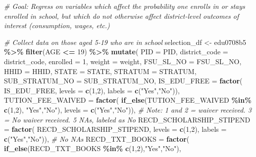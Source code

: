 \documentclass[
]{article}
\newenvironment{Shaded}{\begin{snugshade}}{\end{snugshade}}
\newcommand{\AttributeTok}[1]{\textcolor[rgb]{0.13,0.29,0.53}{#1}}
\newcommand{\CommentTok}[1]{\textcolor[rgb]{0.56,0.35,0.01}{\textit{#1}}}
\newcommand{\DecValTok}[1]{\textcolor[rgb]{0.00,0.00,0.81}{#1}}
\newcommand{\FunctionTok}[1]{\textcolor[rgb]{0.13,0.29,0.53}{\textbf{#1}}}
\newcommand{\NormalTok}[1]{#1}
\newcommand{\OtherTok}[1]{\textcolor[rgb]{0.56,0.35,0.01}{#1}}
\newcommand{\SpecialCharTok}[1]{\textcolor[rgb]{0.81,0.36,0.00}{\textbf{#1}}}
\newcommand{\StringTok}[1]{\textcolor[rgb]{0.31,0.60,0.02}{#1}}
\begin{document}
\begin{Shaded}
\begin{Highlighting}[]
\CommentTok{\# Goal: Regress on variables which affect the probability one enrolls in or stays enrolled in school, but which do not otherwise affect district{-}level outcomes of interest (consumption, wages, etc.)}


\CommentTok{\# Collect data on those aged 5{-}19 who are in school}
\NormalTok{selection\_df }\OtherTok{\textless{}{-}}\NormalTok{ edu0708b5 }\SpecialCharTok{\%\textgreater{}\%}
  \FunctionTok{filter}\NormalTok{(AGE }\SpecialCharTok{\textless{}=} \DecValTok{19}\NormalTok{) }\SpecialCharTok{\%\textgreater{}\%}
  \FunctionTok{mutate}\NormalTok{(}
    \AttributeTok{PID =}\NormalTok{ PID,}
    \AttributeTok{district\_code =}\NormalTok{ district\_code,}
    \AttributeTok{enrolled =} \DecValTok{1}\NormalTok{,}
    \AttributeTok{weight =}\NormalTok{ weight,}
    \AttributeTok{FSU\_SL\_NO =}\NormalTok{ FSU\_SL\_NO,}
    \AttributeTok{HHID =}\NormalTok{ HHID,}
    \AttributeTok{STATE =}\NormalTok{ STATE,}
    \AttributeTok{STRATUM =}\NormalTok{ STRATUM,}
    \AttributeTok{SUB\_STRATUM\_NO =}\NormalTok{ SUB\_STRATUM\_NO,}
    \AttributeTok{IS\_EDU\_FREE =} \FunctionTok{factor}\NormalTok{(}
\NormalTok{      IS\_EDU\_FREE, }
      \AttributeTok{levels =} \FunctionTok{c}\NormalTok{(}\DecValTok{1}\NormalTok{,}\DecValTok{2}\NormalTok{), }
      \AttributeTok{labels =} \FunctionTok{c}\NormalTok{(}\StringTok{"Yes"}\NormalTok{,}\StringTok{"No"}\NormalTok{)),}
    \AttributeTok{TUTION\_FEE\_WAIVED =} \FunctionTok{factor}\NormalTok{(}
      \FunctionTok{if\_else}\NormalTok{(TUTION\_FEE\_WAIVED }\SpecialCharTok{\%in\%} \FunctionTok{c}\NormalTok{(}\DecValTok{1}\NormalTok{,}\DecValTok{2}\NormalTok{), }\StringTok{"Yes"}\NormalTok{,}\StringTok{"No"}\NormalTok{), }
      \AttributeTok{levels =} \FunctionTok{c}\NormalTok{(}\StringTok{"Yes"}\NormalTok{,}\StringTok{"No"}\NormalTok{)), }\CommentTok{\# Note: 1 and 2 = waiver received. 3 = No waiver received. 5 NAs, labeled as No}
    \AttributeTok{RECD\_SCHOLARSHIP\_STIPEND =} \FunctionTok{factor}\NormalTok{(}
\NormalTok{      RECD\_SCHOLARSHIP\_STIPEND,}
      \AttributeTok{levels =} \FunctionTok{c}\NormalTok{(}\DecValTok{1}\NormalTok{,}\DecValTok{2}\NormalTok{),}
      \AttributeTok{labels =} \FunctionTok{c}\NormalTok{(}\StringTok{"Yes"}\NormalTok{,}\StringTok{"No"}\NormalTok{)), }\CommentTok{\# No NAs}
    \AttributeTok{RECD\_TXT\_BOOKS =} \FunctionTok{factor}\NormalTok{(}
      \FunctionTok{if\_else}\NormalTok{(RECD\_TXT\_BOOKS }\SpecialCharTok{\%in\%} \FunctionTok{c}\NormalTok{(}\DecValTok{1}\NormalTok{,}\DecValTok{2}\NormalTok{),}\StringTok{"Yes"}\NormalTok{,}\StringTok{"No"}\NormalTok{), }

\end{Highlighting}
\end{Shaded}
\end{document}
